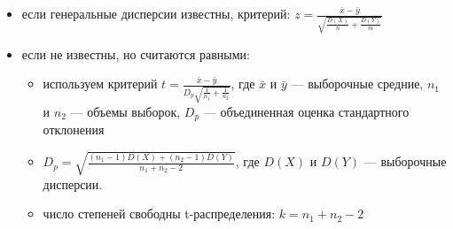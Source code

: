 \documentclass[a4paper,11pt]{article}
\newenvironment{shdd}{\begin{mdframed}[backgroundcolor=shadecolor]}{\end{mdframed}}
\theoremstyle{definition}
\begin{document}
\begin{shdd}
\begin{itemize}
            \begin{itemize}
                \item если генеральные дисперсии известны, критерий: \(z = \frac{\bar{x} - \bar{y}}{\sqrt{\frac{D(X)}{n} + \frac{D(Y)}{m}}}\)
                \item если не известны, но считаются равными:
                \begin{itemize}
                    \item используем критерий \(t = \frac{\bar{x} - \bar{y}}{D_p \sqrt{\frac{1}{n_1} + \frac{1}{n_2}}}\),
                    где \(\bar{x}\) и \(\bar{y}\) — выборочные средние, \(n_1\) и \(n_2\) — объемы выборок, \(D_p\) — объединенная оценка стандартного отклонения
                    \item \(D_p = \sqrt{\frac{(n_1 - 1)D(X) + (n_2 - 1)D(Y)}{n_1 + n_2 - 2}}\), где \(D(X)\) и \(D(Y)\) — выборочные дисперсии.
                    \item число степеней свободны t-распределения: \(k = n_1 + n_2 - 2\)
                \end{itemize}
            \end{itemize}
        \end{itemize}
    \end{shdd}
    \vspace{10pt}
\end{document}
